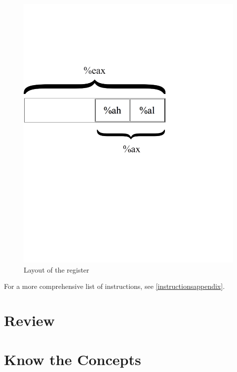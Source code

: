 \begin{figure}
\caption{Layout of the {\eaxReg} register}
\includegraphics[width=\textwidth]{registerdescription.png}
\end{figure}

For a more comprehensive list of instructions, see \autoref{instructionsappendix}.

\section{Review}

\section{Know the Concepts}

